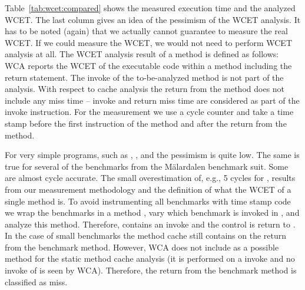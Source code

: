 
%

Table~\ref{tab:wcet:compared} shows the measured execution time and
the analyzed WCET. The last column gives an idea of the pessimism of
the WCET analysis. It has to be noted (again) that we actually cannot
guarantee to measure the real WCET. If we could measure the WCET, we
would not need to perform WCET analysis at all. The WCET analysis
result of a method is defined as follows: WCA reports the WCET of the
executable code within a method including the return statement. The
invoke of the to-be-analyzed method is not part of the analysis. With
respect to cache analysis the return from the method does not include
any miss time -- invoke and return miss time are considered as part
of the invoke instruction. For the measurement we use a cycle counter
and take a time stamp before the first instruction of the method and
after the return from the method.

For very simple programs, such as , , and
 the pessimism is quite low. The same is true for several
of the benchmarks from the M\"alardalen benchmark suit. Some are
almost cycle accurate. The small overestimation of, e.g., 5 cycles
for , results from our measurement methodology and
the definition of what the WCET of a single method is. To avoid
instrumenting all benchmarks with time stamp code we wrap the
benchmarks in a method , vary which benchmark is
invoked in , and analyze this method. Therefore,
 contains an invoke and the control is return to
. In the case of small benchmarks the method cache
still contains  on the return from the benchmark
method. However, WCA does not include  as a possible
method for the static method cache analysis (it is performed on a
invoke and no invoke of  is seen by WCA). Therefore,
the return from the benchmark method is classified as miss.

